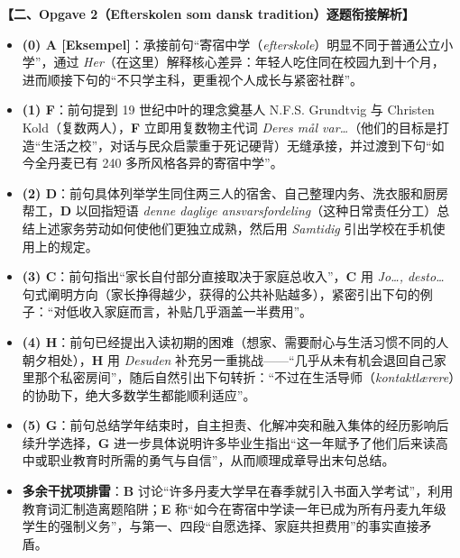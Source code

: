 \begin{answerbox}
\textbf{\color{NCDNavy}【二、Opgave 2（Efterskolen som dansk tradition）逐题衔接解析】}
\begin{itemize}
  \item \textbf{(0) A [Eksempel]}：承接前句“寄宿中学（\textit{efterskole}）明显不同于普通公立小学”，通过 \textit{Her}（在这里）解释核心差异：年轻人吃住同在校园九到十个月，进而顺接下句的“不只学主科，更重视个人成长与紧密社群”。
  \item \textbf{(1) F}：前句提到 19 世纪中叶的理念奠基人 N.F.S. Grundtvig 与 Christen Kold（复数两人），\textbf{F} 立即用复数物主代词 \textit{Deres mål var\ldots}（他们的目标是打造“生活之校”，对话与民众启蒙重于死记硬背）无缝承接，并过渡到下句“如今全丹麦已有 240 多所风格各异的寄宿中学”。
  \item \textbf{(2) D}：前句具体列举学生同住两三人的宿舍、自己整理内务、洗衣服和厨房帮工，\textbf{D} 以回指短语 \textit{denne daglige ansvarsfordeling}（这种日常责任分工）总结上述家务劳动如何使他们更独立成熟，然后用 \textit{Samtidig} 引出学校在手机使用上的规定。
  \item \textbf{(3) C}：前句指出“家长自付部分直接取决于家庭总收入”，\textbf{C} 用 \textit{Jo\ldots, desto\ldots} 句式阐明方向（家长挣得越少，获得的公共补贴越多），紧密引出下句的例子：“对低收入家庭而言，补贴几乎涵盖一半费用”。
  \item \textbf{(4) H}：前句已经提出入读初期的困难（想家、需要耐心与生活习惯不同的人朝夕相处），\textbf{H} 用 \textit{Desuden} 补充另一重挑战——“几乎从未有机会退回自己家里那个私密房间”，随后自然引出下句转折：“不过在生活导师（\textit{kontaktlærere}）的协助下，绝大多数学生都能顺利适应”。
  \item \textbf{(5) G}：前句总结学年结束时，自主担责、化解冲突和融入集体的经历影响后续升学选择，\textbf{G} 进一步具体说明许多毕业生指出“这一年赋予了他们后来读高中或职业教育时所需的勇气与自信”，从而顺理成章导出末句总结。
  \item \textbf{多余干扰项排雷}：\textbf{B} 讨论“许多丹麦大学早在春季就引入书面入学考试”，利用教育词汇制造离题陷阱；\textbf{E} 称“如今在寄宿中学读一年已成为所有丹麦九年级学生的强制义务”，与第一、四段“自愿选择、家庭共担费用”的事实直接矛盾。
\end{itemize}
\end{answerbox}

